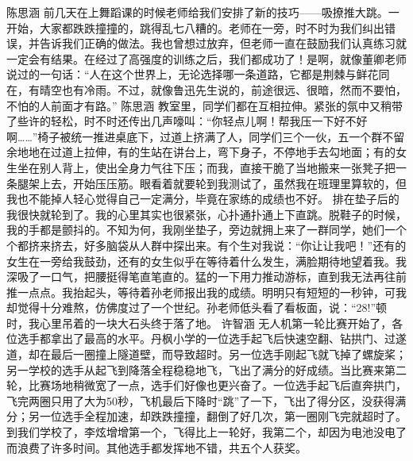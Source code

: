 {}\markdownRendererInterblockSeparator
{}陈思涵\markdownRendererInterblockSeparator
{}前几天在上舞蹈课的时候老师给我们安排了新的技巧——吸撩推大跳。一开始，大家都跌跌撞撞的，跳得乱七八糟的。老师在一旁，时不时为我们纠出错误，并告诉我们正确的做法。我也曾想过放弃，但老师一直在鼓励我们认真练习就一定会有结果。在经过了高强度的训练之后，我们都成功了！是啊，就像董卿老师说过的一句话：“人在这个世界上，无论选择哪一条道路，它都是荆棘与鲜花同在，有晴空也有冷雨。不过，就像鲁迅先生说的，前途很远、很暗，然而不要怕，不怕的人前面才有路。”\markdownRendererInterblockSeparator
{}\markdownRendererInterblockSeparator
{}陈思涵\markdownRendererInterblockSeparator
{}教室里，同学们都在互相拉伸。紧张的氛中又稍带了些许的轻松，时不时还传出几声嚎叫：“你轻点儿啊！帮我压一下好不好啊……”椅子被统一推进桌底下，过道上挤满了人，同学们三个一伙，五一个群不留余地地在过道上拉伸，有的生站在讲台上，弯下身子，不停地手去勾地面；有的女生坐在别人背上，使出全身力气往下压；而我，直接干脆了当地搬来一张凳子把一条腿架上去，开始压压筋。眼看着就要轮到我测试了，虽然我在班理里算软的，但我也不能掉人轻心觉得自己一定满分，毕竟在家练的成绩也不好。\markdownRendererInterblockSeparator
{}排在垫子后的我很快就轮到了。我的心里其实也很紧张，心扑通扑通上下直跳。脱鞋子的时候，我的手都是颤抖的。不知为何，我刚坐垫子，旁边就拥上来了一群同学，她们一个个都挤来挤去，好多脑袋从人群中探出来。有个生对我说：“你让让我吧！”还有的女生在一旁给我鼓劲，还有的女生似乎在等待着什么发生，满脸期待地望着我。我深吸了一口气，把腰挺得笔直笔直的。猛的一下用力推动游标，直到我无法再往前推一点点。我抬起头，等待着孙老师报出我的成绩。明明只有短短的一秒钟，可我却觉得十分难熬，仿佛度过了一个世纪。孙老师低头看了看板面，说：“28!”顿时，我心里吊着的一块大石头终于落了地。\markdownRendererInterblockSeparator
{}\markdownRendererInterblockSeparator
{}许智涵\markdownRendererInterblockSeparator
{}无人机第一轮比赛开始了，各位选手都拿出了最高的水平。丹枫小学的一位选手起飞后快速空翻、钻拱门、过遂道，却在最后一圈撞上隧道壁，而导致超时。另一位选手刚起飞就飞掉了螺旋桨；另一学校的选手从起飞到降落全程稳稳地飞，飞出了满分的好成绩。当比赛来第二轮，比赛场地稍微宽了一点，选手们好像也更兴奋了。一位选手起飞后直奔拱门，飞完两圈只用了大为50秒，飞机最后下降时“跳”了一下，飞出了得分区，没获得满分；另一位选手全程加速，却跌跌撞撞，翻倒了好几次，第一圈刚飞完就超时了。到我们学校了，李炫增增第一个，飞得比上一轮好，我第二个，却因为电池没电了而浪费了许多时间。其他选手都发挥地不错，共五个人获奖。\markdownRendererInterblockSeparator
{}\markdownRendererInterblockSeparator
